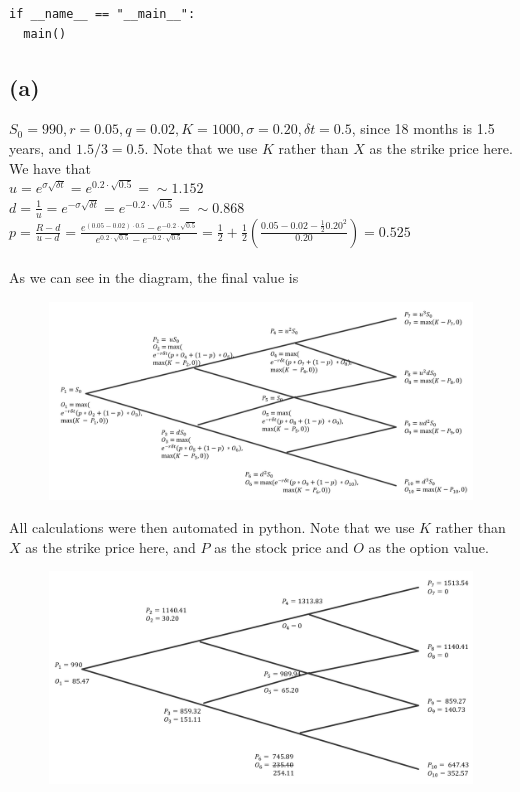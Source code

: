 \documentclass{article}
\begin{document}
{\begin{verbatim}
if __name__ == "__main__":
  main()

\end{verbatim}

\newpage

\subsection*{(a)}

$S_0 = 990, r = 0.05, q = 0.02, K = 1000, \sigma = 0.20, \delta t = 0.5$, since 18 months is 1.5 years, and $1.5 / 3 = 0.5$. Note that we use $K$ rather than $X$ as the strike price here. \\
We have that \\
$u = e^{\sigma\sqrt{\delta t}} = e^{0.2 \cdot \sqrt{0.5}} = \sim 1.152$ \\
$d = \frac{1}{u} = e^{-\sigma\sqrt{\delta t}} = e^{-0.2 \cdot \sqrt{0.5}} = \sim 0.868$ \\
$p = \frac{R - d}{u - d} = \frac{e^{(0.05 - 0.02) \cdot 0.5} - e^{-0.2 \cdot \sqrt{0.5}}}{e^{0.2 \cdot \sqrt{0.5}} - e^{-0.2 \cdot \sqrt{0.5}}} = \frac{1}{2} + \frac{1}{2}(\frac{0.05 - 0.02 - \frac{1}{2}0.20^2}{0.20}) = 0.525$ \\ \\
As we can see in the diagram, the final value is 

\begin{figure}[h]
  \centering
  \includegraphics[width=120mm]{./2a_tree.png}
\end{figure}

All calculations were then automated in python. Note that we use $K$ rather than $X$ as the strike price here, and $P$ as the stock price and $O$ as the option value.

\begin{figure}[h]
  \centering
  \includegraphics[width=120mm]{./2a_finaltree.png}
\end{figure}

}
\end{document}
